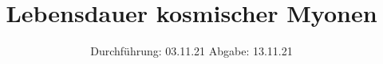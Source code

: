 

\subject{V01}
\title{Lebensdauer kosmischer Myonen}
\date{%
  Durchführung: 03.11.21
  \hspace{3em}
  Abgabe: 13.11.21
}



\maketitle
\thispagestyle{empty}
\tableofcontents
\newpage






\printbibliography{}


